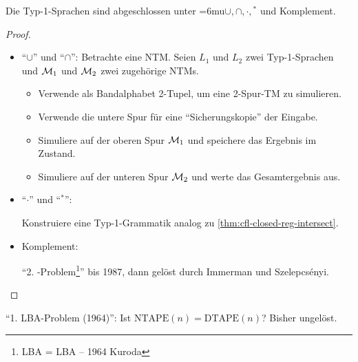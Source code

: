 {\begin{Satz}
	Die Typ-1-Sprachen sind abgeschlossen unter {\thinmuskip=6mu$\cup,\cap,\cdot,{}^*$} und Komplement.
\end{Satz}
\begin{proof}~
    \begin{itemize}
     \item "`$\cup$"' und "`$\cap$"':
     Betrachte eine \ac{NTM}.
     Seien $L_1$ und $L_2$ zwei Typ-1-Sprachen und $\mathcal{M}_1$ und $\mathcal{M}_2$ zwei zugehörige \ac{NTM}s.
     \begin{itemize}
     
     \item Verwende als Bandalphabet 2-Tupel, um eine 2-Spur-\ac{TM} zu simulieren.
     \item Verwende die untere Spur für eine "`Sicherungskopie"' der Eingabe.
     \item Simuliere auf der oberen Spur $\mathcal{M}_1$ und speichere das Ergebnis im Zustand.
     \item Simuliere auf der unteren Spur $\mathcal{M}_2$ und werte das Gesamtergebnis aus.
     \end{itemize}
     \item  "`$\cdot$"' und "`$^*$"':
     
     Konstruiere eine Typ-1-Grammatik analog zu \autoref{thm:cfl-closed-reg-intersect}.
     
     \item Komplement:
     
     "`2. -Problem\footnote{\acs*{LBA} = \acl*{LBA} -- 1964 Kuroda}"' bis 1987, dann gelöst durch Immerman und Szelepcsényi.
     \qedhere
    \end{itemize}
\end{proof}
\begin{Bemerkung}
  "`1. \ac{LBA}-Problem (1964)"': Ist $\mathrm{NTAPE}(n) = \mathrm{DTAPE}(n)$? Bisher ungelöst.
\end{Bemerkung}


}
